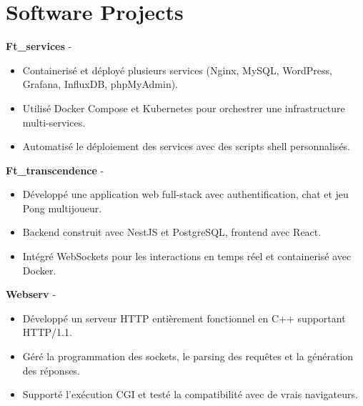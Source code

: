 \documentclass[a4paper,11pt]{article}%
\begin{document}
\section*{Software Projects}%
%
\noindent \textbf{Ft\_services} - \href{https://github.com/sboof911/ft_services}{{}}%
\begin{itemize}[leftmargin=2em,label={},parsep=0pt,topsep=1em]%
\item Containeris\'e et d\'eploy\'e plusieurs services (Nginx, MySQL, WordPress, Grafana, InfluxDB, phpMyAdmin).%
\item Utilis\'e Docker Compose et Kubernetes pour orchestrer une infrastructure multi-services.%
\item Automatis\'e le d\'eploiement des services avec des scripts shell personnalis\'es.%
\end{itemize}%
%
\noindent \textbf{Ft\_transcendence} - \href{https://github.com/sboof911/ft_transcendence}{{}}%
\begin{itemize}[leftmargin=2em,label={},parsep=0pt,topsep=1em]%
\item D\'evelopp\'e une application web full-stack avec authentification, chat et jeu Pong multijoueur.%
\item Backend construit avec NestJS et PostgreSQL, frontend avec React.%
\item Int\'egr\'e WebSockets pour les interactions en temps r\'eel et containeris\'e avec Docker.%
\end{itemize}%
%
\noindent \textbf{Webserv} - \href{https://github.com/sboof911/webserv}{{}}%
\begin{itemize}[leftmargin=2em,label={},parsep=0pt,topsep=1em]%
\item D\'evelopp\'e un serveur HTTP enti\`erement fonctionnel en C++ supportant HTTP/1.1.%
\item G\'er\'e la programmation des sockets, le parsing des requ\^etes et la g\'en\'eration des r\'eponses.%
\item Support\'e l'ex\'ecution CGI et test\'e la compatibilit\'e avec de vrais navigateurs.%
\end{itemize}%
\end{document}

